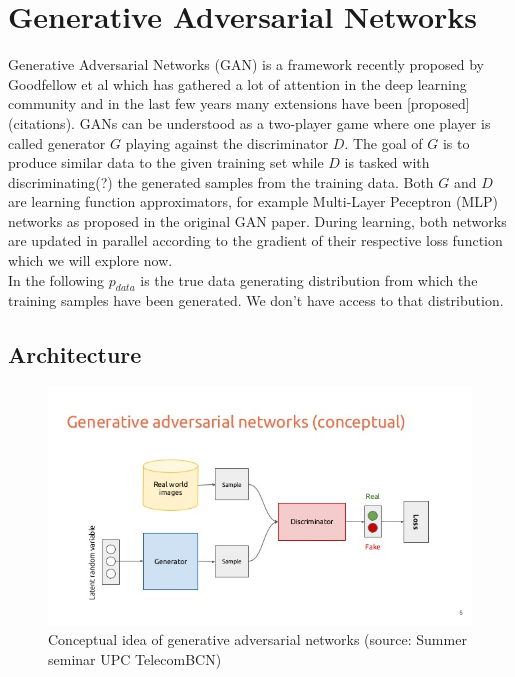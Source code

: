 \section{Generative Adversarial Networks}
\label{sec:gan}

Generative Adversarial Networks (GAN) is a framework recently proposed by Goodfellow et al which has gathered a lot of attention in the deep learning community and in the last few years many extensions have been [proposed] (citations).
GANs can be understood as a two-player game where one player is called generator $G$ playing against the discriminator $D$.
The goal of $G$ is to produce similar data to the given training set while $D$ is tasked with discriminating(?) the generated samples from the training data. Both $G$ and $D$ are learning function approximators, for example Multi-Layer Peceptron (MLP) networks as proposed in the original GAN paper.
During learning, both networks are updated in parallel according to the gradient of their respective loss function which we will explore now.\\
In the following $p_{data}$ is the true data generating distribution from which the training samples have been generated.
We don't have access to that distribution.

\subsection{Architecture}
\label{sub:gan_arch}


\begin{figure}[htb]
\centering
  \includegraphics[width=\linewidth]{media/deep-learning-for-computer-vision-generative-models-and-adversarial-training-upc-2016-5-638.jpg}
  \caption{Conceptual idea of generative adversarial networks (source: Summer seminar UPC TelecomBCN)}\label{fig:gan_architecture}
\end{figure}


